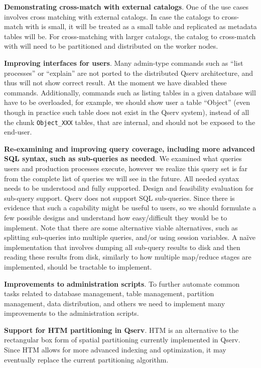 \documentclass[DM,lsstdraft,toc]{lsstdoc}
\begin{document}
\textbf{Demonstrating cross-match with external catalogs}. One of the
use cases involves cross matching with external catalogs. In case the
catalogs to cross-match with is small, it will be treated as a small
table and replicated as metadata tables will be. For cross-matching with
larger catalogs, the catalog to cross-match with will need to be
partitioned and distributed on the worker nodes.

\textbf{Improving interfaces for users}. Many admin-type commands such
as ``list processes'' or ``explain'' are not ported to the distributed
Qserv architecture, and thus will not show correct result. At the moment
we have disabled these commands. Additionally, commands such as listing
tables in a given database will have to be overloaded, for example, we
should show user a table ``Object'' (even though in practice such table
does not exist in the Qserv system), instead of all the chunk
\texttt{Object\_XXX} tables, that are internal, and should not be
exposed to the end-user.

\textbf{Re-examining and improving query coverage, including more
advanced SQL syntax, such as sub-queries as needed}. We examined what
queries users and production processes execute, however we realize this
query set is far from the complete list of queries we will see in the
future. All needed syntax needs to be understood and fully supported.
Design and feasibility evaluation for sub-query support. Qserv does not
support SQL sub-queries. Since there is evidence that such a capability
might be useful to users, so we should formulate a few possible designs
and understand how easy/difficult they would be to implement. Note that
there are some alternative viable alternatives, such as splitting
sub-queries into multiple queries, and/or using session variables. A
naïve implementation that involves dumping all sub-query results to disk
and then reading these results from disk, similarly to how multiple
map/reduce stages are implemented, should be tractable to implement.

\textbf{Improvements to administration scripts}. To further automate
common tasks related to database management, table management, partition
management, data distribution, and others we need to implement many
improvements to the administration scripts.

\textbf{Support for HTM partitioning in Qserv}. HTM is an alternative to
the rectangular box form of spatial partitioning currently implemented
in Qserv. Since HTM allows for more advanced indexing and optimization,
it may eventually replace the current partitioning algorithm.
\end{document}
